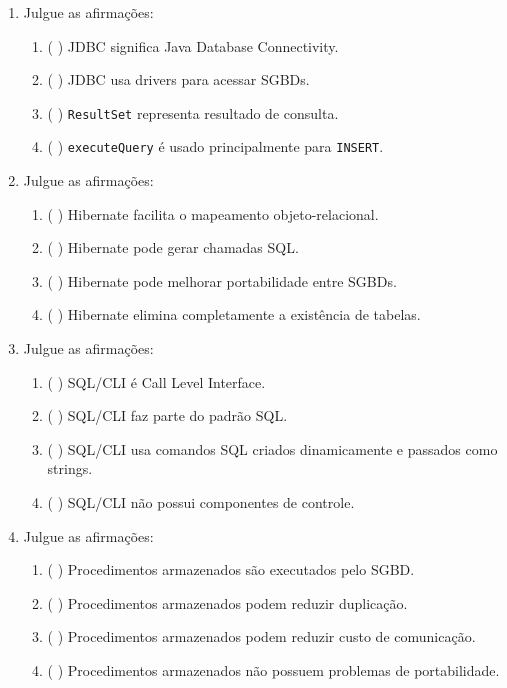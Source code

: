 \documentclass[12pt,a4paper]{article}
\begin{document}
\begin{enumerate}[resume,label=\textbf{Q\arabic*.}]
\item Julgue as afirmações:

\begin{enumerate}[label=\alph*)]
    \item ( \quad ) JDBC significa Java Database Connectivity.
    \item ( \quad ) JDBC usa drivers para acessar SGBDs.
    \item ( \quad ) \texttt{ResultSet} representa resultado de consulta.
    \item ( \quad ) \texttt{executeQuery} é usado principalmente para \texttt{INSERT}.
\end{enumerate}

\item Julgue as afirmações:

\begin{enumerate}[label=\alph*)]
    \item ( \quad ) Hibernate facilita o mapeamento objeto-relacional.
    \item ( \quad ) Hibernate pode gerar chamadas SQL.
    \item ( \quad ) Hibernate pode melhorar portabilidade entre SGBDs.
    \item ( \quad ) Hibernate elimina completamente a existência de tabelas.
\end{enumerate}

\item Julgue as afirmações:

\begin{enumerate}[label=\alph*)]
    \item ( \quad ) SQL/CLI é Call Level Interface.
    \item ( \quad ) SQL/CLI faz parte do padrão SQL.
    \item ( \quad ) SQL/CLI usa comandos SQL criados dinamicamente e passados como strings.
    \item ( \quad ) SQL/CLI não possui componentes de controle.
\end{enumerate}

\item Julgue as afirmações:

\begin{enumerate}[label=\alph*)]
    \item ( \quad ) Procedimentos armazenados são executados pelo SGBD.
    \item ( \quad ) Procedimentos armazenados podem reduzir duplicação.
    \item ( \quad ) Procedimentos armazenados podem reduzir custo de comunicação.
    \item ( \quad ) Procedimentos armazenados não possuem problemas de portabilidade.
\end{enumerate}


\end{enumerate}
\end{document}
